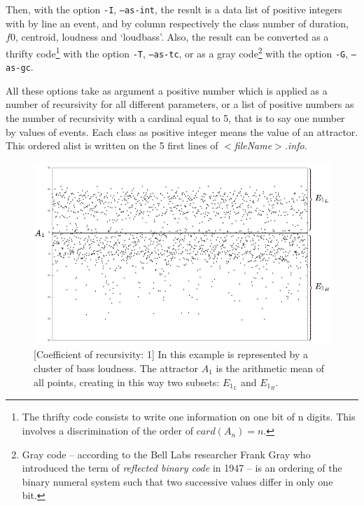 \bigskip

Then, with the option \texttt{-I}, \texttt{--as-int}, the result is a data list of positive integers with by line an event, and by column respectively the class number of duration, $f0$, centroid, loudness and `loudbass'. Also, the result can be converted as a thrifty code\footnote{The thrifty code consists to write one information on one bit of n digits. This involves a discrimination of the order of $card(A_n) = n$.} with the option \texttt{-T}, \texttt{--as-tc}, or as a gray code\footnote{Gray code -- according to the Bell Labs researcher Frank Gray who introduced the term of \textit{reflected binary code} in 1947 -- is an ordering of the binary numeral system such that two successive values differ in only one bit.} with the option \texttt{-G}, \texttt{--as-gc}.

\bigskip

All these options take as argument a positive number which is applied as a number of recursivity for all different parameters, or a list of positive numbers as the number of recursivity with a cardinal equal to 5, that is to say one number by values of events.
Each class as positive integer means the value of an attractor. This ordered alist is written on the 5 first lines of \textsl{$<$fileName$>$.info}.

\bigskip

\begin{figure}[!hbt]
	\begin{center}
		\includegraphics[scale=0.4]{img/1265}
		\caption{[Coefficient of recursivity: 1] In this example is represented by a cluster of bass loudness. The attractor $A_1$ is the arithmetic mean of all points, creating in this way two subsets: $E_{1_L}$ and $E_{1_H}$.}
		\label{fig:gb1}
	\end{center}
\end{figure}

